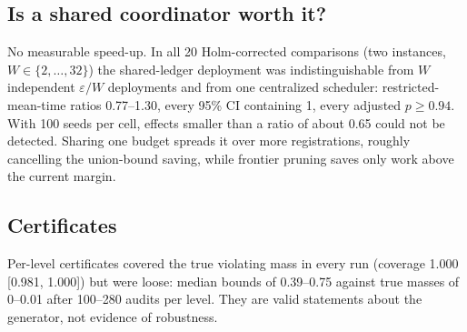 \documentclass[pdflatex,sn-mathphys-num]{sn-jnl}
\theoremstyle{thmstyleone}
\theoremstyle{thmstyletwo}
\theoremstyle{thmstylethree}
\begin{document}
\subsection{Is a shared coordinator worth it?}
No measurable speed-up. In all 20 Holm-corrected comparisons (two instances, $W\in\{2,\dots,32\}$) the shared-ledger deployment was indistinguishable from $W$ independent $\varepsilon/W$ deployments and from one centralized scheduler: restricted-mean-time ratios 0.77--1.30, every 95\% CI containing 1, every adjusted $p\ge0.94$. With 100 seeds per cell, effects smaller than a ratio of about 0.65 could not be detected. Sharing one budget spreads it over more registrations, roughly cancelling the union-bound saving, while frontier pruning saves only work above the current margin.

\subsection{Certificates}
Per-level certificates covered the true violating mass in every run (coverage 1.000 [0.981, 1.000]) but were loose: median bounds of 0.39--0.75 against true masses of 0--0.01 after 100--280 audits per level. They are valid statements about the generator, not evidence of robustness.
\end{document}
